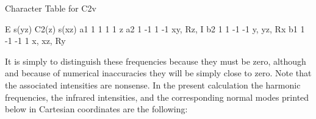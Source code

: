 \begin{sourcelisting}
                    Character Table for C2v

                             E   s(yz) C2(z) s(xz)
                    a1       1     1     1     1  z
                    a2       1    -1     1    -1  xy, Rz, I
                    b2       1     1    -1    -1  y, yz, Rx
                    b1       1    -1    -1     1  x, xz, Ry
\end{sourcelisting}

It is simply to distinguish these frequencies because they must be zero,
although and because of numerical inaccuracies they will be simply close
to zero. Note that the associated intensities are nonsense.
In the present calculation the harmonic frequencies, the infrared
intensities, and the corresponding normal modes printed below in Cartesian
coordinates are the following:

